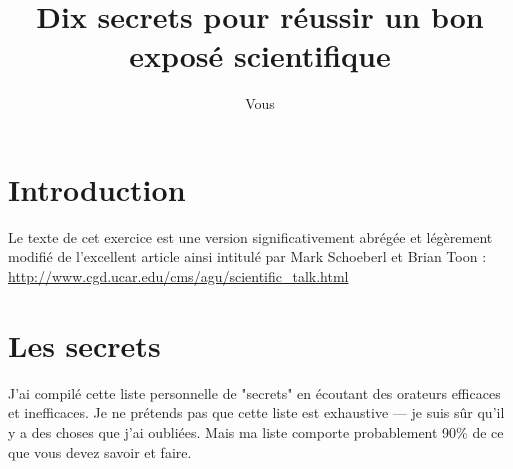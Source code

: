 \documentclass[12pt]{article}
\title{Dix secrets pour réussir un bon exposé scientifique}
\author{Vous}
\begin{document}
\maketitle

\section{Introduction}

Le texte de cet exercice est une version significativement abrégée et légèrement modifié
de l'excellent article ainsi intitulé par Mark Schoeberl et Brian Toon :
\url{http://www.cgd.ucar.edu/cms/agu/scientific_talk.html}

\section{Les secrets}

J'ai compilé cette liste personnelle de "secrets" en écoutant des orateurs efficaces et inefficaces. Je ne prétends pas que cette liste est exhaustive --- je suis sûr qu'il y a des choses que j'ai oubliées. Mais ma liste comporte probablement 90\% de ce que vous devez savoir et faire.
\end{document}
